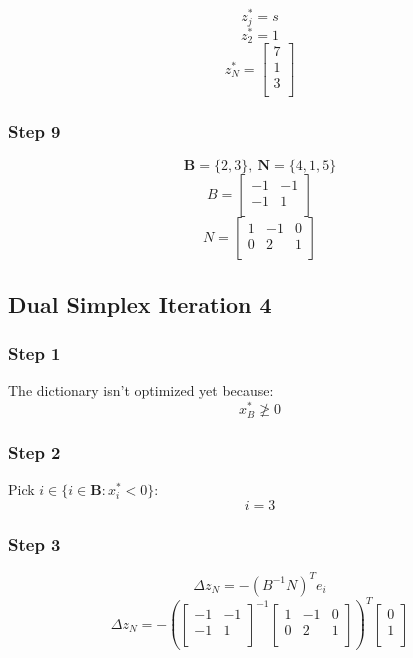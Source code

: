 \documentclass[14pt]{extarticle}
\begin{document}
\[
    z^*_j = s
\]
\[
    z^*_2 = 1
\]
\[
    z^*_N = \begin{bmatrix}
        7 \\
        1 \\
        3 \\
    \end{bmatrix}
\]

\subsubsection*{Step 9}
\[
    \boldsymbol{B} = \{2, 3\},\ \boldsymbol{N} = \{4, 1, 5\}
\]
\[
    B = \begin{bmatrix}
        -1 & -1 \\
        -1 & 1 \\
    \end{bmatrix}
\]
\[
    N = \begin{bmatrix}
        1 & -1 & 0 \\
        0 & 2 & 1 \\
    \end{bmatrix}
\]

\subsection*{Dual Simplex Iteration 4}
\subsubsection*{Step 1}
The dictionary isn't optimized yet because:
\[
    x^*_B \ngeq 0
\]

\subsubsection*{Step 2}
Pick $i \in \{i \in \boldsymbol{B}: x^*_i < 0\}$:
\[
    i = 3
\]

\subsubsection*{Step 3}
\[
    \Delta z_N = -(B^{-1}N)^T e_i
\]
\[
    \Delta z_N = -\left(\begin{bmatrix}
        -1 & -1 \\
        -1 & 1 \\
    \end{bmatrix}^{-1}
    \begin{bmatrix}
        1 & -1 & 0 \\
        0 & 2 & 1 \\
    \end{bmatrix}\right)^T
    \begin{bmatrix}
        0 \\
        1 \\
    \end{bmatrix}
\]
\end{document}
